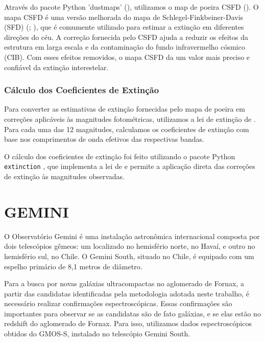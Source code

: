 \vspace{\baselineskip}

Através do pacote Python 'dustmaps' (\cite{dustmapsGreen2018}), utilizamos o map de poeira CSFD (\cite{chiang2023correctedsfdaccurategalactic}).  O mapa CSFD é uma versão melhorada do mapa de Schlegel-Finkbeiner-Davis (SFD) (\cite{Schlegel_1998}; \cite{Schlafly_2011}), que é comumente utilizado para estimar a extinção em diferentes direções do céu. A correção fornecida pelo CSFD ajuda a reduzir os efeitos da estrutura em larga escala e da contaminação do fundo infravermelho cósmico (CIB). Com esses efeitos removidos, o mapa CSFD da um valor mais preciso e confiável da extinção interestelar.

\vspace{\baselineskip}

\subsubsection*{Cálculo dos Coeficientes de Extinção}
Para converter as estimativas de extinção fornecidas pelo mapa de poeira em correções aplicáveis às magnitudes fotométricas, utilizamos a lei de extinção de \cite{cardelli1989dust}. Para cada uma das 12 magnitudes, calculamos os coeficientes de extinção com base nos comprimentos de onda efetivos das respectivas bandas.

\sloppy
O cálculo dos coeficientes de extinção foi feito utilizando o pacote Python \texttt{extinction} \cite{barbary2017extinction}, que implementa a lei de \cite{cardelli1989dust} e permite a aplicação direta das correções de extinção às magnitudes observadas.

\section{GEMINI}
O Observatório Gemini é uma instalação astronômica internacional composta por dois telescópios gêmeos: um localizado no hemisfério norte, no Havaí, e outro no hemisfério sul, no Chile. O Gemini South, situado no Chile, é equipado com um espelho primário de 8,1 metros de diâmetro.

Para a busca por novas galáxias ultracompactas no aglomerado de Fornax, a partir das candidatas identificadas pela metodologia adotada neste trabalho, é necessário realizar confirmações espectroscópicas. Essas confirmações são importantes para observar se as candidatas são de fato galáxias, e se elas estão no redshift do aglomerado de Fornax. Para isso, utilizamos dados espectroscópicos obtidos do GMOS-S, instalado no telescópio Gemini South.

